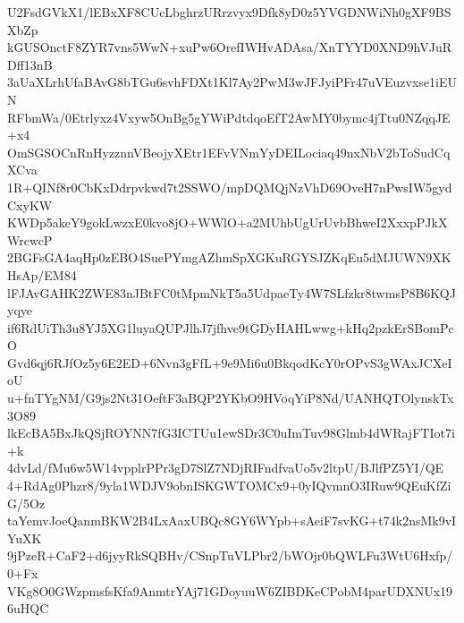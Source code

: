 U2FsdGVkX1/lEBxXF8CUcLbghrzURrzvyx9Dfk8yD0z5YVGDNWiNh0gXF9BSXbZp
kGUSOnctF8ZYR7vns5WwN+xuPw6OrefIWHvADAsa/XnTYYD0XND9hVJuRDff13nB
3aUaXLrhUfaBAvG8bTGu6svhFDXt1Kl7Ay2PwM3wJFJyiPFr47uVEuzvxse1iEUN
RFbmWa/0Etrlyxz4Vxyw5OnBg5gYWiPdtdqoEfT2AwMY0bymc4jTtu0NZqqJE+x4
OmSGSOCnRnHyzznnVBeojyXEtr1EFvVNmYyDEILociaq49nxNbV2bToSudCqXCva
1R+QINf8r0CbKxDdrpvkwd7t2SSWO/mpDQMQjNzVhD69OveH7nPwsIW5gydCxyKW
KWDp5akeY9gokLwzxE0kvo8jO+WWlO+a2MUhbUgUrUvbBhweI2XxxpPJkXWrcwcP
2BGFsGA4aqHp0zEBO4SuePYmgAZhmSpXGKuRGYSJZKqEu5dMJUWN9XKHsAp/EM84
lFJAvGAHK2ZWE83nJBtFC0tMpmNkT5a5UdpaeTy4W7SLfzkr8twmsP8B6KQJyqye
if6RdUiTh3u8YJ5XG1luyaQUPJlhJ7jfhve9tGDyHAHLwwg+kHq2pzkErSBomPcO
Gvd6qj6RJfOz5y6E2ED+6Nvn3gFfL+9e9Mi6u0BkqodKcY0rOPvS3gWAxJCXeIoU
u+fnTYgNM/G9js2Nt31OeftF3aBQP2YKbO9HVoqYiP8Nd/UANHQTOlynskTx3O89
lkEcBA5BxJkQSjROYNN7fG3ICTUu1ewSDr3C0uImTuv98Glmb4dWRajFTIot7i+k
4dvLd/fMu6w5W14vpplrPPr3gD7SlZ7NDjRIFndfvaUo5v2ltpU/BJlfPZ5YI/QE
4+RdAg0Phzr8/9yla1WDJV9obnISKGWTOMCx9+0yIQvmnO3IRuw9QEuKfZiG/5Oz
taYemvJoeQanmBKW2B4LxAaxUBQc8GY6WYpb+sAeiF7svKG+t74k2nsMk9vIYuXK
9jPzeR+CaF2+d6jyyRkSQBHv/CSnpTuVLPbr2/bWOjr0bQWLFu3WtU6Hxfp/0+Fx
VKg8O0GWzpmsfsKfa9AnmtrYAj71GDoyuuW6ZIBDKeCPobM4parUDXNUx196uHQC
